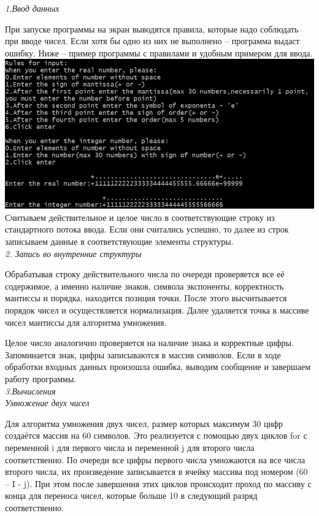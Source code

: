 \documentclass[a4paper, 12pt, -shell-escape]{article}  %
\begin{document}
	\textit{1.Ввод данных}
	
	При запуске программы на экран выводятся правила, которые надо соблюдать при вводе чисел. Если хотя бы одно из них не выполнено – программа выдаст ошибку. Ниже – пример программы с правилами и удобным примером для ввода.\\
	
	\includegraphics[width=\linewidth]{start}\\
	Считываем действительное и целое число в соответствующие строку из стандартного потока ввода. Если они считались успешно, то далее из строк записываем данные в соответствующие элементы структуры.\\
	
	\textit{2. Запись во внутренние структуры}
	
	Обрабатывая строку действительного числа по очереди проверяется все её содержимое, а именно наличие знаков, символа экспоненты, корректность мантиссы и порядка, находится позиция точки. После этого высчитывается порядок чисел и осуществляется нормализация. Далее удаляется точка в массиве чисел мантиссы для алгоритма умножения.
	
	Целое число аналогично проверяется на наличие знака и корректные цифры. Запоминается знак, цифры записываются в массив символов.
	Если в ходе обработки входных данных произошла ошибка, выводим сообщение и завершаем работу программы.\\
	
	\textit{3.Вычисления}\\
	
	\textit{Умножение двух чисел}

	Для алгоритма умножения двух чисел, размер которых максимум 30 цифр создаётся массив на 60 символов. Это реализуется с помощью двух циклов for с переменной i для первого числа и переменной j для второго числа соответственно. По очереди все цифры первого числа умножаются на все числа второго числа, их произведение записывается в ячейку массива под номером (60 – I - j). При этом после завершения этих циклов происходит проход по массиву с конца для переноса чисел, которые больше 10 в следующий разряд соответственно.\\
	
\end{document}
